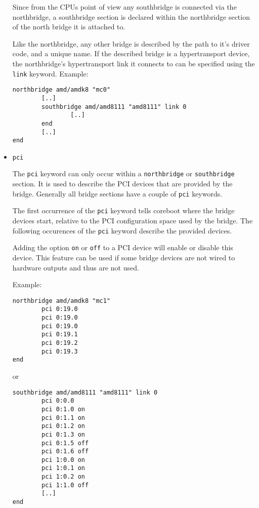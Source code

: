 \documentclass[titlepage,12pt]{article}
\begin{document}
\begin{itemize}
Since from the CPUs point of view any southbridge is connected via the
northbridge, a southbridge section is declared within the northbridge
section of the north bridge it is attached to.

Like the northbridge, any other bridge is described by the path to it's
driver code, and a unique name. If the described bridge is a
hypertransport device, the northbridge's hypertransport link it connects
to can be specified using the \texttt{link} keyword. Example:

\begin{verbatim}
northbridge amd/amdk8 "mc0"
        [..]
        southbridge amd/amd8111 "amd8111" link 0
                [..]
        end
        [..]
end
\end{verbatim}

\item \begin{verbatim}pci\end{verbatim}

The \texttt{pci} keyword can only occur within a \texttt{northbridge} or
\texttt{southbridge} section. It is used to describe the PCI devices
that are provided by the bridge.  Generally all bridge sections have a
couple of \texttt{pci} keywords.

The first occurrence of the \texttt{pci} keyword tells coreboot where
the bridge devices start, relative to the PCI configuration space used
by the bridge. The following occurences of the \texttt{pci} keyword
describe the provided devices. 

Adding the option \texttt{on} or \texttt{off} to a PCI device will
enable or disable this device. This feature can be used if some bridge
devices are not wired to hardware outputs and thus are not used.

Example:

\begin{verbatim}
northbridge amd/amdk8 "mc1"
        pci 0:19.0
        pci 0:19.0
        pci 0:19.0
        pci 0:19.1
        pci 0:19.2
        pci 0:19.3
end
\end{verbatim}

or

\begin{verbatim}
southbridge amd/amd8111 "amd8111" link 0
        pci 0:0.0
        pci 0:1.0 on
        pci 0:1.1 on
        pci 0:1.2 on
        pci 0:1.3 on
        pci 0:1.5 off
        pci 0:1.6 off
        pci 1:0.0 on
        pci 1:0.1 on
        pci 1:0.2 on
        pci 1:1.0 off
        [..]
end
\end{verbatim}


\end{itemize}
\end{document}
